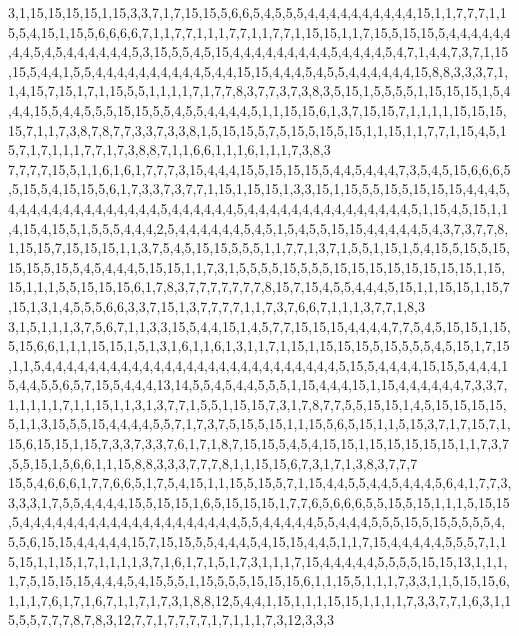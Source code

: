 3,1,15,15,15,15,1,15,3,3,7,1,7,15,15,5,6,6,5,4,5,5,5,4,4,4,4,4,4,4,4,4,4,15,1,1,7,7,7,1,15,5,4,15,1,15,5,6,6,6,6,7,1,1,7,7,1,1,1,7,7,1,1,7,7,1,15,15,1,1,7,15,5,15,15,5,4,4,4,4,4,4,4,4,5,4,5,4,4,4,4,4,4,5,3,15,5,5,4,5,15,4,4,4,4,4,4,4,4,4,5,4,4,4,4,5,4,7,1,4,4,7,3,7,1,15,15,5,4,4,1,5,5,4,4,4,4,4,4,4,4,4,4,5,4,4,15,15,4,4,4,5,4,5,5,4,4,4,4,4,4,15,8,8,3,3,3,7,1,1,4,15,7,15,1,7,1,15,5,5,1,1,1,1,7,1,7,7,8,3,7,7,3,7,3,8,3,5,15,1,5,5,5,5,1,15,15,15,1,5,4,4,4,15,5,4,4,5,5,5,15,15,5,5,4,5,5,4,4,4,4,5,1,1,15,15,6,1,3,7,15,15,7,1,1,1,1,15,15,15,15,7,1,1,7,3,8,7,8,7,7,3,3,7,3,3,8,1,5,15,15,5,7,5,15,5,15,5,15,1,1,15,1,1,7,7,1,15,4,5,15,7,1,7,1,1,1,7,7,1,7,3,8,8,7,1,1,6,6,1,1,1,6,1,1,1,7,3,8,3
7,7,7,7,15,5,1,1,6,1,6,1,7,7,7,3,15,4,4,4,15,5,15,15,15,5,4,4,5,4,4,4,7,3,5,4,5,15,6,6,6,5,5,15,5,4,15,15,5,6,1,7,3,3,7,3,7,7,1,15,1,15,15,1,3,3,15,1,15,5,5,15,5,15,15,15,4,4,4,5,4,4,4,4,4,4,4,4,4,4,4,4,4,4,5,4,4,4,4,4,4,5,4,4,4,4,4,4,4,4,4,4,4,4,4,4,4,5,1,15,4,5,15,1,1,4,15,4,15,5,1,5,5,5,4,4,4,2,5,4,4,4,4,4,4,5,4,5,1,5,4,5,5,15,15,4,4,4,4,4,5,4,3,7,3,7,7,8,1,15,15,7,15,15,15,1,1,3,7,5,4,5,15,15,5,5,5,1,1,7,7,1,3,7,1,5,5,1,15,1,5,4,15,5,15,5,15,15,15,5,15,5,4,5,4,4,4,5,15,15,1,1,7,3,1,5,5,5,5,15,5,5,5,15,15,15,15,15,15,15,15,1,15,15,1,1,1,5,5,15,15,15,6,1,7,8,3,7,7,7,7,7,7,7,8,15,7,15,4,5,5,4,4,4,5,15,1,1,15,15,1,15,7,15,1,3,1,4,5,5,5,6,6,3,3,7,15,1,3,7,7,7,7,1,1,7,3,7,6,6,7,1,1,1,3,7,7,1,8,3
3,1,5,1,1,1,3,7,5,6,7,1,1,3,3,15,5,4,4,15,1,4,5,7,7,15,15,15,4,4,4,4,7,7,5,4,5,15,15,1,15,5,15,6,6,1,1,1,15,15,1,5,1,3,1,6,1,1,6,1,3,1,1,7,1,15,1,15,15,15,5,15,5,5,5,4,5,15,1,7,15,1,1,5,4,4,4,4,4,4,4,4,4,4,4,4,4,4,4,4,4,4,4,4,4,4,4,4,4,4,4,5,15,5,4,4,4,4,15,15,5,4,4,4,15,4,4,5,5,6,5,7,15,5,4,4,4,13,14,5,5,4,5,4,4,5,5,5,1,15,4,4,4,15,1,15,4,4,4,4,4,4,7,3,3,7,1,1,1,1,1,7,1,1,15,1,1,3,1,3,7,7,1,5,5,1,15,15,7,3,1,7,8,7,7,5,5,15,15,1,4,5,15,15,15,15,5,1,1,3,15,5,5,15,4,4,4,4,5,5,7,1,7,3,7,5,15,5,15,1,1,15,5,6,5,15,1,1,5,15,3,7,1,7,15,7,1,15,6,15,15,1,15,7,3,3,7,3,3,7,6,1,7,1,8,7,15,15,5,4,5,4,15,15,1,15,15,15,15,15,1,1,7,3,7,5,5,15,1,5,6,6,1,1,15,8,8,3,3,3,7,7,7,8,1,1,15,15,6,7,3,1,7,1,3,8,3,7,7,7
15,5,4,6,6,6,1,7,7,6,6,5,1,7,5,4,15,1,1,15,5,15,5,7,1,15,4,4,5,5,4,4,5,4,4,4,5,6,4,1,7,7,3,3,3,3,1,7,5,5,4,4,4,4,15,5,15,15,1,6,5,15,15,15,1,7,7,6,5,6,6,6,5,5,15,5,15,1,1,1,5,15,15,5,4,4,4,4,4,4,4,4,4,4,4,4,4,4,4,4,4,4,4,4,5,5,4,4,4,4,4,5,5,4,4,4,5,5,5,15,5,15,5,5,5,5,4,5,5,6,15,15,4,4,4,4,4,15,7,15,15,5,5,4,4,4,5,4,15,15,4,4,5,1,1,7,15,4,4,4,4,4,5,5,5,7,1,15,15,1,1,15,1,7,1,1,1,1,3,7,1,6,1,7,1,5,1,7,3,1,1,1,7,15,4,4,4,4,4,5,5,5,5,15,15,13,1,1,1,1,7,5,15,15,15,4,4,4,5,4,15,5,5,1,15,5,5,5,15,15,15,6,1,1,15,5,1,1,1,7,3,3,1,1,5,15,15,6,1,1,1,7,6,1,7,1,6,7,1,1,7,1,7,3,1,8,8,12,5,4,4,1,15,1,1,1,15,15,1,1,1,1,7,3,3,7,7,1,6,3,1,15,5,5,7,7,7,8,7,8,3,12,7,7,1,7,7,7,7,1,7,1,1,1,7,3,12,3,3,3

